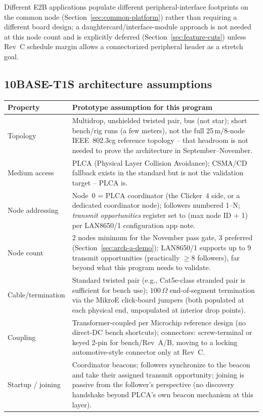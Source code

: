 Different E2B applications populate different peripheral-interface footprints on the common node (Section~\ref{sec:common-platform}) rather than requiring a different board design; a daughtercard/interface-module approach is not needed at this node count and is explicitly deferred (Section~\ref{sec:feature-cuts}) unless Rev~C schedule margin allows a connectorized peripheral header as a stretch goal.

\subsection{10BASE-T1S architecture assumptions}

\begin{center}
\small
\begin{tabularx}{\linewidth}{@{}p{3.0cm} X@{}}
\toprule
\textbf{Property} & \textbf{Prototype assumption for this program} \\
\midrule
Topology & Multidrop, unshielded twisted pair, bus (not star); short bench/rig runs (a few meters), not the full 25\,m/8-node IEEE~802.3cg reference topology -- that headroom is not needed to prove the architecture in September--November. \\
Medium access & PLCA (Physical Layer Collision Avoidance); CSMA/CD fallback exists in the standard but is not the validation target -- PLCA is. \\
Node addressing & Node~0 = PLCA coordinator (the Clicker~4 side, or a dedicated coordinator node); followers numbered 1--N; \emph{transmit opportunities} register set to (max node ID + 1) per LAN8650/1 configuration app note. \\
Node count & 2 nodes minimum for the November pass gate, 3 preferred (Section~\ref{sec:arch-a-demo}); LAN8650/1 supports up to 9 transmit opportunities (practically $\geq$8 followers), far beyond what this program needs to validate. \\
Cable/termination & Standard twisted pair (e.g., Cat5e-class stranded pair is sufficient for bench use); $100\,\Omega$ end-of-segment termination via the MikroE click-board jumpers (both populated at each physical end, unpopulated at interior drop points). \\
Coupling & Transformer-coupled per Microchip reference design (no direct-DC bench shortcuts); connectors: screw-terminal or keyed 2-pin for bench/Rev~A/B, moving to a locking automotive-style connector only at Rev~C. \\
Startup / joining & Coordinator beacons; followers synchronize to the beacon and take their assigned transmit opportunity; joining is passive from the follower's perspective (no discovery handshake beyond PLCA's own beacon mechanism at this layer). \\

\end{tabularx}
\end{center}
